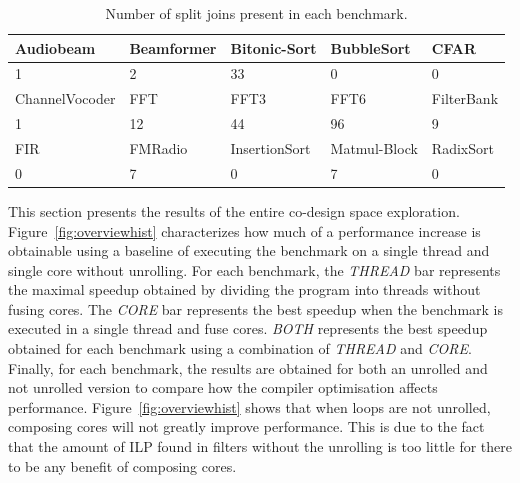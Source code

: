\begin{table}[!htb]
  \small
 \begin{tabular} { | l | l | l | l | l | }
 \hline
   \cellcolor[gray]{0.7}Audiobeam&  \cellcolor[gray]{0.7} Beamformer& \cellcolor[gray]{0.7}Bitonic-Sort  &  \cellcolor[gray]{0.7} BubbleSort &  \cellcolor[gray]{0.7}  CFAR\\ \hline
  1 & 2 & 33 & 0 & 0 \\ \hline
   \cellcolor[gray]{0.7}ChannelVocoder &  \cellcolor[gray]{0.7} FFT&  \cellcolor[gray]{0.7}FFT3 &  \cellcolor[gray]{0.7} FFT6&  \cellcolor[gray]{0.7}FilterBank \\ \hline
  1 & 12 & 44 & 96 & 9 \\ \hline 
   \cellcolor[gray]{0.7}FIR &  \cellcolor[gray]{0.7} FMRadio &  \cellcolor[gray]{0.7} InsertionSort &  \cellcolor[gray]{0.7} Matmul-Block &  \cellcolor[gray]{0.7} RadixSort\\ \hline
  0 & 7 & 0 & 7 & 0 \\ \hline
 \end{tabular}
  \caption{Number of split joins present in each benchmark.}\label{tab:splitjoin}
\end{table}

This section  presents the results of the entire co-design space exploration.
Figure~\ref{fig:overviewhist} characterizes how much of a performance increase is obtainable using a baseline of executing the benchmark on a single thread and single core without unrolling.
For each benchmark, the \textit{THREAD} bar represents the maximal speedup obtained by dividing the program into threads without fusing cores.
The \textit{CORE} bar represents the best speedup when the benchmark is executed in a single thread and fuse cores.
\textit{BOTH} represents the best speedup obtained for each benchmark using a combination of \textit{THREAD} and \textit{CORE}.
Finally, for each benchmark, the results are obtained for both an unrolled and not unrolled version to compare how the compiler optimisation affects performance.
Figure~\ref{fig:overviewhist} shows that when loops are not unrolled, composing cores will not greatly improve performance.
This is due to the fact that the amount of ILP found in filters without the unrolling is too little for there to be any benefit of composing cores.

